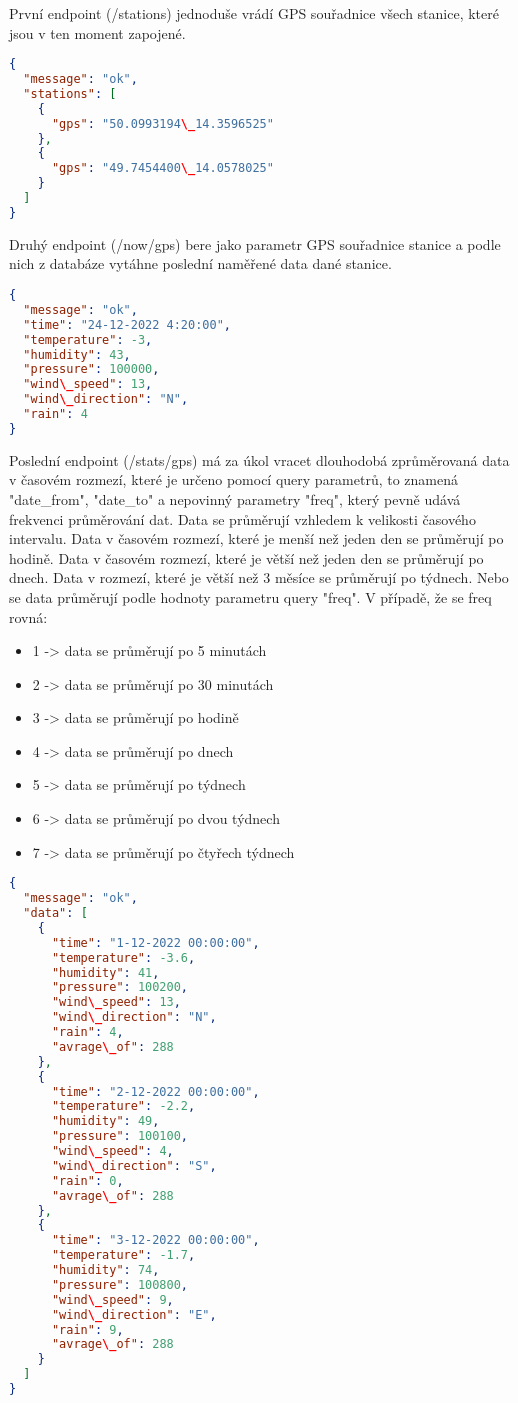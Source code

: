 První endpoint (/stations) jednoduše vrádí GPS souřadnice všech stanice, které jsou v ten moment zapojené.
\begin{lstlisting}[language=json,firstnumber=1, caption=Příklad požadavku /stations]
{
  "message": "ok",
  "stations": [
    {
      "gps": "50.0993194\_14.3596525"
    },
    {
      "gps": "49.7454400\_14.0578025"
    }
  ]
}
\end{lstlisting}
Druhý endpoint (/now/{gps}) bere jako parametr GPS souřadnice stanice a podle nich z databáze vytáhne poslední naměřené data dané stanice.
\begin{lstlisting}[language=json,firstnumber=1, caption=Příklad požadavku /now/{gps} ]
{
  "message": "ok",
  "time": "24-12-2022 4:20:00",
  "temperature": -3,
  "humidity": 43,
  "pressure": 100000,
  "wind\_speed": 13,
  "wind\_direction": "N",
  "rain": 4
}
\end{lstlisting}
Poslední endpoint (/stats/{gps}) má za úkol vracet dlouhodobá zprůměrovaná data v časovém rozmezí, které je určeno pomocí query parametrů,
to znamená "date\_from", "date\_to" a nepovinný parametry "freq", který pevně udává frekvenci průměrování dat. Data se průměrují vzhledem k velikosti časového intervalu.
Data v časovém rozmezí, které je menší než jeden den se průměrují po hodině.
Data v časovém rozmezí, které je větší než jeden den se průměrují po dnech. Data v rozmezí, které je větší než 3 měsíce se průměrují po týdnech.
Nebo se data průměrují podle hodnoty parametru query "freq". V případě, že se freq rovná:
\begin{itemize}
  \item 1 -> data se průměrují po 5 minutách
  \item 2 -> data se průměrují po 30 minutách
  \item 3 -> data se průměrují po hodině 
  \item 4 -> data se průměrují po dnech 
  \item 5 -> data se průměrují po týdnech 
  \item 6 -> data se průměrují po dvou týdnech 
  \item 7 -> data se průměrují po čtyřech týdnech 
\end{itemize}
\begin{lstlisting}[language=json,firstnumber=1, caption=Příklad požadavku /stats/{gps}?date\_from=1-12-2022&date\_to=3-12-2022&freq=4 ]
{
  "message": "ok",
  "data": [
    {
      "time": "1-12-2022 00:00:00",
      "temperature": -3.6,
      "humidity": 41,
      "pressure": 100200,
      "wind\_speed": 13,
      "wind\_direction": "N",
      "rain": 4,
      "avrage\_of": 288
    },
    {
      "time": "2-12-2022 00:00:00",
      "temperature": -2.2,
      "humidity": 49,
      "pressure": 100100,
      "wind\_speed": 4,
      "wind\_direction": "S",
      "rain": 0,
      "avrage\_of": 288
    },
    {
      "time": "3-12-2022 00:00:00",
      "temperature": -1.7,
      "humidity": 74,
      "pressure": 100800,
      "wind\_speed": 9,
      "wind\_direction": "E",
      "rain": 9,
      "avrage\_of": 288
    }
  ]
}
\end{lstlisting}
